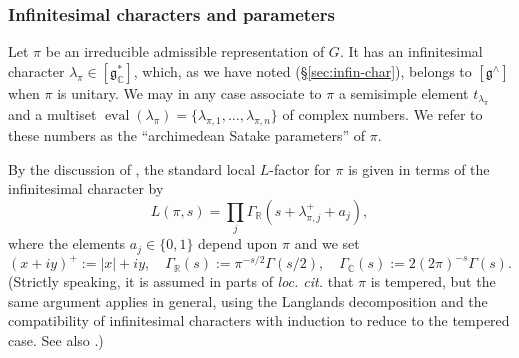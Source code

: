 \documentclass[reqno]{amsart}
\DeclareMathOperator{\ev}{eval}
\theoremstyle{plain} \newtheorem{theorem} {Theorem}
\theoremstyle{definition} \newtheorem{definition} [theorem] {Definition}
\theoremstyle{itplain} %
\numberwithin{equation}{section}
\numberwithin{theorem}{section}
\begin{document}
\subsubsection{Infinitesimal characters and parameters}
Let $\pi$ be an irreducible admissible representation of $G$.  It has an infinitesimal character $\lambda_\pi \in [\mathfrak{g}_{\mathbb{C}}^*]$, which, as we have noted (\S\ref{sec:infin-char}), belongs to $[\mathfrak{g}^\wedge]$ when $\pi$ is unitary.  We may in any case associate to $\pi$ a semisimple element $t_{\lambda_\pi}$ and a multiset $\ev(\lambda_{\pi}) = \{\lambda_{\pi,1},\dotsc, \lambda_{\pi,n}\}$ of complex numbers.  We refer to these numbers as the ``archimedean Satake parameters'' of $\pi$. 

By the discussion of \cite[\S15.4]{nelson-venkatesh-1}, the standard local $L$-factor for $\pi$ is given in terms of the infinitesimal character by
\[
  L(\pi,s) =
  \prod_j \Gamma_\mathbb{R}(s + \lambda_{\pi,j}^+ + a_j),
\]
where the elements $a_j \in \{0, 1\}$ depend upon $\pi$ and we set
\[
  (x + i y)^+ := |x| + i y, \quad \Gamma_\mathbb{R}(s) := \pi^{-s/2} \Gamma(s/2), \quad \Gamma_{\mathbb{C}}(s) := 2 (2 \pi)^{-s} \Gamma(s).
\]
(Strictly speaking, it is assumed in parts of \emph{loc. cit.} that $\pi$ is tempered, but the same argument applies in general, using the
Langlands decomposition \cite[Theorem 8.54]{MR855239} and the compatibility of infinitesimal characters with induction \cite[Proposition 8.22]{MR855239} to reduce to the tempered case.  See also \cite[Appendix]{MR1395406}.)
\end{document}
